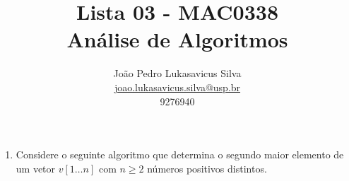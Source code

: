 \documentclass{article}
\title{
    Lista 03 - MAC0338\\
    Análise de Algoritmos
}
\author{
    João Pedro Lukasavicus Silva\\
    \href{mailto:joao.lukasavicus.silva@usp.br}
    {joao.lukasavicus.silva@usp.br}\\
    9276940
}
\begin{document}
\maketitle

\begin{enumerate}[itemsep=3ex, label=\textbf{\arabic*}.]
   \item 
    Considere o seguinte algoritmo que determina o segundo maior elemento de um vetor $v[1 \dots n]$ com $n \geq 2$ números positivos distintos.

    \begin{algorithm}[H]
        
    \end{algorithm}
    

\end{enumerate}
\end{document}
